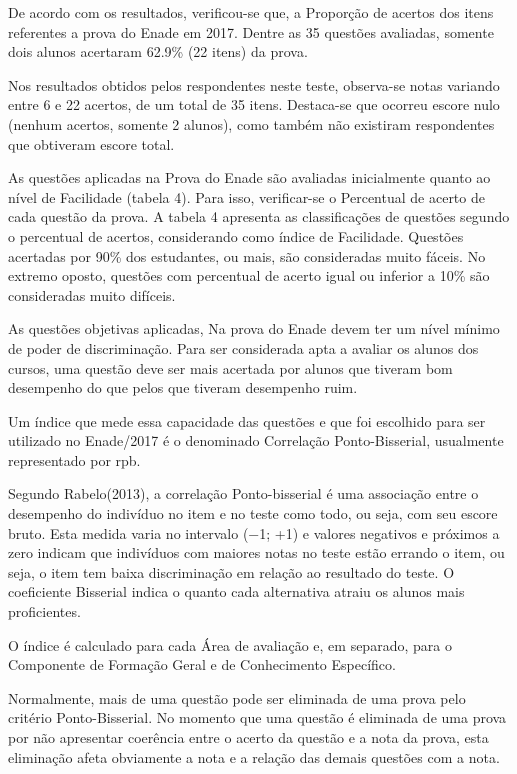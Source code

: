 \documentclass[12pt]{article}
\begin{document}
De acordo com os resultados, verificou-se que, a Proporção de acertos dos itens referentes a prova do Enade em 2017. Dentre as 35 questões avaliadas, somente dois alunos acertaram 62.9\% (22 itens) da prova. 

Nos resultados obtidos pelos respondentes neste teste, observa-se notas variando entre 6 e 22 acertos, de um total de 35 itens. Destaca-se que ocorreu escore nulo (nenhum acertos, somente 2 alunos), como também não existiram respondentes que obtiveram escore total.  


As questões aplicadas na Prova do Enade são avaliadas inicialmente quanto ao nível de Facilidade (tabela 4). Para isso, verificar-se o Percentual de acerto de cada questão da prova. A tabela 4 apresenta as classificações de questões segundo o percentual de acertos, considerando como índice de Facilidade. Questões acertadas por 90\% dos estudantes, ou mais, são consideradas muito fáceis. No extremo oposto, questões com percentual de acerto igual ou inferior a 10\% são consideradas muito difíceis.    

As questões objetivas aplicadas, Na prova do Enade devem ter um nível mínimo de poder de discriminação. Para ser considerada apta a avaliar os alunos dos cursos, uma questão deve ser mais acertada por alunos que tiveram bom desempenho do que pelos que tiveram desempenho ruim. 

Um índice que mede essa capacidade das questões e que foi escolhido para ser utilizado no Enade/2017 é o denominado Correlação Ponto-Bisserial, usualmente representado por rpb.

Segundo Rabelo(2013), a correlação Ponto-bisserial é uma associação entre o desempenho do indivíduo no item e no teste como todo, ou seja, com seu escore bruto. Esta medida varia no intervalo (−1; +1) e valores negativos e próximos a zero indicam que indivíduos com maiores notas no teste estão errando o item, ou seja, o item tem baixa discriminação em relação ao resultado do teste. O coeficiente Bisserial indica o quanto cada alternativa atraiu os alunos mais proficientes.

O índice é calculado para cada Área de avaliação e, em separado, para o Componente de Formação Geral e de Conhecimento Específico.

Normalmente, mais de uma questão pode ser eliminada de uma prova pelo critério Ponto-Bisserial. No momento que uma questão é eliminada de uma prova por não apresentar coerência entre o acerto da questão e a nota da prova, esta eliminação afeta obviamente a nota e a relação das demais questões com a nota. 
\end{document}
